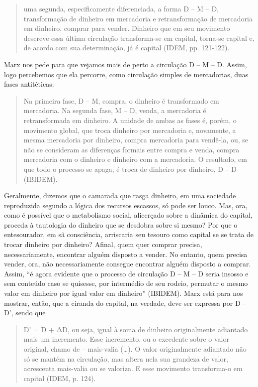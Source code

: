 \begin{quote}
uma segunda, especificamente diferenciada, a forma D -- M -- D,
transformação de dinheiro em mercadoria e retransformação de mercadoria
em dinheiro, comprar para vender. Dinheiro que em seu movimento descreve
essa última circulação transforma-se em capital, torna-se capital e, de
acordo com sua determinação, já é capital (IDEM, pp. 121-122).
\end{quote}

Marx nos pede para que vejamos mais de perto a circulação D -- M -- D.
Assim, logo percebemos que ela percorre, como circulação simples de
mercadorias, duas fases antitéticas:

\begin{quote}
Na primeira fase, D -- M, compra, o dinheiro é transformado em
mercadoria. Na segunda fase, M -- D, venda, a mercadoria é
retransformada em dinheiro. A unidade de ambas as fases é, porém, o
movimento global, que troca dinheiro por mercadoria e, novamente, a
mesma mercadoria por dinheiro, compra mercadoria para vendê-la, ou, se
não se consideram as diferenças formais entre compra e venda, compra
mercadoria com o dinheiro e dinheiro com a mercadoria. O resultado, em
que todo o processo se apaga, é troca de dinheiro por dinheiro, D -- D
(IBIDEM).
\end{quote}

Geralmente, dizemos que o camarada que rasga dinheiro, em uma sociedade
reproduzida segundo a lógica dos recursos escassos, só pode ser louco.
Mas, ora, como é possível que o metabolismo social, alicerçado sobre a
dinâmica do capital, proceda à tautologia do dinheiro que se desdobra
sobre si mesmo? Por que o entesourador, em sã consciência, arriscaria
seu tesouro como capital se se trata de trocar dinheiro por dinheiro?
Afinal, quem quer comprar precisa, necessariamente, encontrar alguém
disposto a vender. No entanto, quem precisa vender, ora, não
necessariamente consegue encontrar alguém disposto a comprar. Assim, ``é
agora evidente que o processo de circulação D -- M -- D seria insosso e
sem conteúdo caso se quisesse, por intermédio de seu rodeio, permutar o
mesmo valor em dinheiro por igual valor em dinheiro'' (IBIDEM). Marx
está para nos mostrar, então, que a ciranda do capital, na verdade, deve
ser expressa por D -- D', sendo que

\begin{quote}
D' = D + ΔD, ou seja, igual à soma de dinheiro originalmente adiantado
mais um incremento. Esse incremento, ou o excedente sobre o valor
original, chamo de -- mais-valia (\ldots{}). O valor originalmente
adiantado não só se mantém na circulação, mas altera nela sua grandeza
de valor, acrescenta mais-valia ou se valoriza. E esse movimento
transforma-o em capital (IDEM, p. 124).
\end{quote}

